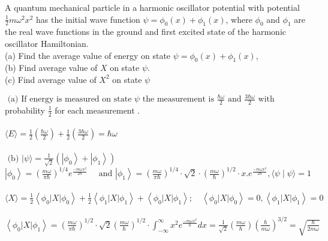 \begin{enumerate}
\begin{minipage}{\textwidth}
	\item A quantum mechanical particle in a harmonic oscillator potential with potential $\frac{1}{2} m \omega^{2} x^{2}$ has the initial wave function $\psi=\phi_{0}(x)+\phi_{1}(x)$, where $\phi_{0}$ and $\phi_{1}$ are the real wave functions in the ground and first excited state of the harmonic oscillator Hamiltonian.\\
	(a) Find the average value of energy on state $\psi=\phi_{0}(x)+\phi_{1}(x)$,\\
	(b) Find average value of $X$ on state $\psi$.\\
	(c) Find average value of $X^{2}$ on state $\psi$
\end{minipage}
\begin{answer}
$\text { (a) If energy is measured on state } \psi \text { the measurement is } \frac{\hbar \omega}{2} \text { and } \frac{3 \hbar \omega}{2} \text { with }$\\
probability $\frac{1}{2}$ for each measurement .\\\\
$\langle E\rangle=\frac{1}{2}\left(\frac{\hbar \omega}{2}\right)+\frac{1}{2}\left(\frac{3 \hbar \omega}{2}\right)=\hbar \omega$\\\\
$\text { (b) }|\psi\rangle=\frac{1}{\sqrt{2}}\left(\left|\phi_{0}\right\rangle+\left|\phi_{1}\right\rangle\right)$\\
$\left|\phi_{0}\right\rangle=\left(\frac{m \omega}{\pi \hbar}\right)^{1 / 4} e^{\frac{-m \omega x^{2}}{2 \hbar}} \quad \text { and }\left|\phi_{1}\right\rangle=\left(\frac{m \omega}{\pi \hbar}\right)^{1 / 4} \cdot \sqrt{2} \cdot\left(\frac{m \omega}{\hbar}\right)^{1 / 2} \cdot x . e^{\frac{-m \omega x^{2}}{2 \hbar}},\langle\psi \mid \psi\rangle=1$\\\\
$\langle X\rangle=\frac{1}{2}\left\langle\phi_{0}|X| \phi_{0}\right\rangle+\frac{1}{2}\left\langle\phi_{1}|X| \phi_{1}\right\rangle+\left\langle\phi_{0}|X| \phi_{1}\right\rangle ; \quad\left\langle\phi_{0}|X| \phi_{0}\right\rangle=0,\left\langle\phi_{1}|X| \phi_{1}\right\rangle=0$\\\\
$\left\langle\phi_{0}|X| \phi_{1}\right\rangle=\left(\frac{m \omega}{\pi \hbar}\right)^{1 / 2} \cdot \sqrt{2}\left(\frac{m \omega}{\hbar}\right)^{1 / 2} \cdot \int_{-\infty}^{\infty} x^{2} e^{\frac{-m \omega x^{2}}{\hbar}} d x=\frac{1}{\sqrt{2}}\left(\frac{m \omega}{\hbar}\right)\left(\frac{\hbar}{m \omega}\right)^{3 / 2}=\sqrt{\frac{\hbar}{2 m \omega}}$\\\\

\end{answer}
\end{enumerate}
